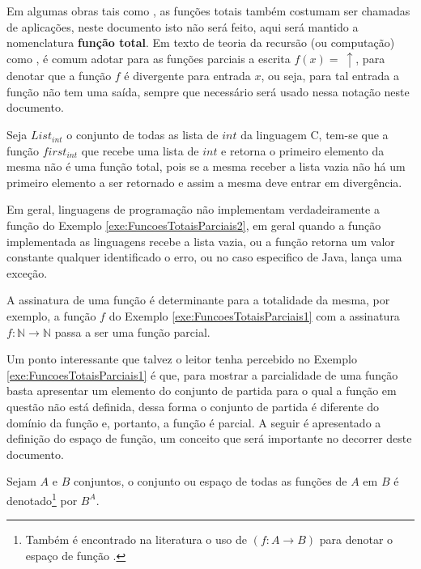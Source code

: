 Em algumas obras tais como \cite{carmo2013}, as funções totais também costumam ser chamadas de aplicações, neste documento isto não será feito, aqui será mantido a nomenclatura \textbf{função total}. Em texto de teoria da recursão (ou computação) como \cite{claudio2016}, é comum adotar para as funções parciais a escrita $f(x) = \ \uparrow$, para denotar que a função $f$ é divergente para entrada $x$, ou seja, para tal entrada a função não tem uma saída, sempre que necessário será usado nessa notação neste documento.

\begin{exemplo}\label{exe:FuncoesTotaisParciais2}
	Seja $List_{int}$ o conjunto de todas as lista de $int$ da linguagem C, tem-se que a função $first_{int}$ que recebe uma lista de $int$ e retorna o primeiro elemento da mesma não é uma função total, pois se a mesma receber a lista vazia não há um primeiro elemento a ser retornado e assim a mesma deve entrar em divergência.
\end{exemplo}

Em geral, linguagens de programação não implementam verdadeiramente a função do Exemplo \ref{exe:FuncoesTotaisParciais2}, em geral quando a função implementada as linguagens recebe a lista vazia, ou a função retorna um valor constante qualquer identificado o erro, ou no caso especifico de Java, lança uma exceção.

\begin{atencao}
  A assinatura de uma função é determinante para a totalidade da mesma, por exemplo, a função $f$ do Exemplo \ref{exe:FuncoesTotaisParciais1} com a assinatura $f: \mathbb{N} \rightarrow \mathbb{N}$ passa a ser uma função parcial.
\end{atencao}

Um ponto interessante que talvez o leitor tenha percebido no Exemplo \ref{exe:FuncoesTotaisParciais1} é que, para mostrar a parcialidade de uma função basta apresentar um elemento do conjunto de partida para o qual a função em questão não está definida, dessa forma o conjunto de partida é diferente do domínio da função e, portanto, a função é parcial. A seguir é apresentado a definição do espaço de função, um conceito que será importante no decorrer deste documento.

\begin{definicao}\label{def:EspacoFuncao}
	Sejam $A$ e $B$ conjuntos, o conjunto ou espaço de todas as funções de $A$ em $B$ é denotado\footnote{Também é encontrado na literatura o uso de $(f: A \rightarrow B)$ para denotar o espaço de função \cite{fmcbook}.} por $B^A$.
\end{definicao}

